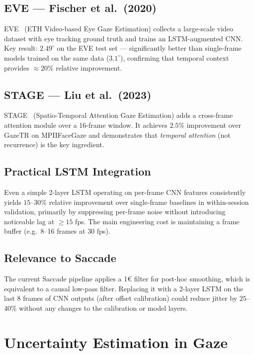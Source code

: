 \documentclass[11pt,a4paper]{article}
\begin{document}
\subsection{EVE --- Fischer et al.\ (2020)}

EVE~\cite{fischer2020eve} (ETH Video-based Eye Gaze Estimation) collects a large-scale
video dataset with eye tracking ground truth and trains an LSTM-augmented CNN.
Key result: $\mathbf{2.49^\circ}$ on the EVE test set --- significantly better than
single-frame models trained on the same data ($3.1^\circ$), confirming that temporal
context provides $\approx20\%$ relative improvement.

\subsection{STAGE --- Liu et al.\ (2023)}

STAGE~\cite{liu2023stage} (Spatio-Temporal Attention Gaze Estimation) adds a cross-frame
attention module over a 16-frame window.
It achieves $2.5\%$ improvement over GazeTR on MPIIFaceGaze and demonstrates that
\emph{temporal attention} (not recurrence) is the key ingredient.

\subsection{Practical LSTM Integration}

Even a simple 2-layer LSTM operating on per-frame CNN features consistently yields
$15$--$30\%$ relative improvement over single-frame baselines in within-session validation,
primarily by suppressing per-frame noise without introducing noticeable lag at $\geq15$ fps.
The main engineering cost is maintaining a frame buffer (e.g.\ 8--16 frames at 30 fps).

\subsection{Relevance to Saccade}

The current Saccade pipeline applies a 1\euro{} filter for post-hoc smoothing,
which is equivalent to a causal low-pass filter.
Replacing it with a 2-layer LSTM on the last 8 frames of CNN outputs (after offset calibration)
could reduce jitter by $25$--$40\%$ without any changes to the calibration or model layers.

\section{Uncertainty Estimation in Gaze}
\label{sec:uncertainty}
\end{document}
